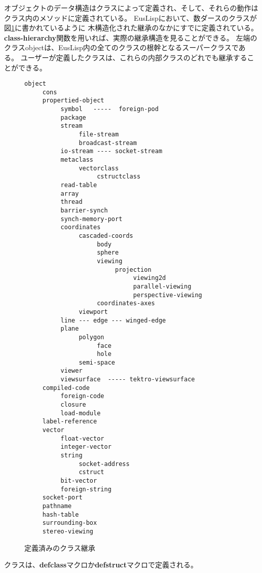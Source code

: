 オブジェクトのデータ構造はクラスによって定義され、そして、それらの動作は
クラス内のメソッドに定義されている。
EusLispにおいて、数ダースのクラスが図\ref{ClassHierarchy}に書かれているように
木構造化された継承のなかにすでに定義されている。
{\bf class-hierarchy}関数を用いれば、実際の継承構造を見ることができる。
左端のクラスobjectは、EusLisp内の全てのクラスの根幹となるスーパークラスである。
ユーザーが定義したクラスは、これらの内部クラスのどれでも継承することができる。

\begin{figure}
\small
\begin{verbatim}
object
     cons
     propertied-object
          symbol   -----  foreign-pod
          package
          stream
               file-stream
               broadcast-stream
          io-stream ---- socket-stream
          metaclass
               vectorclass
                    cstructclass
          read-table
          array
          thread
          barrier-synch
          synch-memory-port
          coordinates
               cascaded-coords
                    body
                    sphere
                    viewing
                         projection
                              viewing2d
                              parallel-viewing
                              perspective-viewing
                    coordinates-axes
               viewport
          line --- edge --- winged-edge
          plane
               polygon
                    face
                    hole
               semi-space
          viewer
          viewsurface  ----- tektro-viewsurface
     compiled-code
          foreign-code
          closure
          load-module
     label-reference
     vector
          float-vector
          integer-vector
          string
               socket-address
               cstruct
          bit-vector
          foreign-string
     socket-port
     pathname
     hash-table
     surrounding-box
     stereo-viewing
\end{verbatim}
\normalsize
\caption{\label{ClassHierarchy}定義済みのクラス継承}
\end{figure}

クラスは、{\bf defclass}マクロか{\bf defstruct}マクロで定義される。


